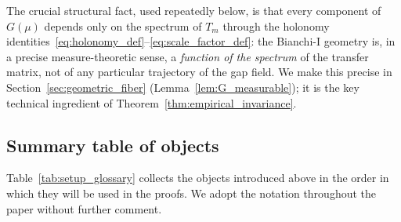 \noindent
The crucial structural fact, used repeatedly below, is that every
component of $G(\mu)$ depends only on the spectrum of $T_m$ through the
holonomy identities~\eqref{eq:holonomy_def}--\eqref{eq:scale_factor_def}:
the Bianchi-I geometry is, in a precise measure-theoretic sense, a
\emph{function of the spectrum} of the transfer matrix, not of any
particular trajectory of the gap field. We make this precise in
Section~\ref{sec:geometric_fiber} (Lemma~\ref{lem:G_measurable}); it is
the key technical ingredient of Theorem~\ref{thm:empirical_invariance}.

\subsection{Summary table of objects}
\label{ssec:summary_objects}

Table~\ref{tab:setup_glossary} collects the objects introduced above
in the order in which they will be used in the proofs. We adopt the
notation throughout the paper without further comment.

